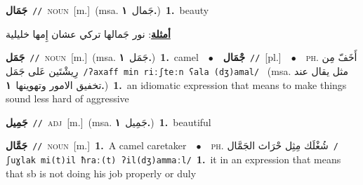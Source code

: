 \documentclass[10pt,a4paper,twoside]{article} %
\begin{document}
\begin{multicols}{2}
{\setlength\topsep{0pt}\textbf{\foreignlanguage{arabic}{جَمَال}}\ {\color{gray}\texttt{//}\color{black}}\ \textsc{noun}\ [m.]\ \color{gray}(msa. \foreignlanguage{arabic}{جَمال}~\foreignlanguage{arabic}{\textbf{١.}})\color{black}\ \textbf{1.}~beauty\  \begin{flushright}\color{gray}\foreignlanguage{arabic}{\textbf{\underline{\foreignlanguage{arabic}{أمثلة}}}: نور جَمالها تركي عشان إِمها خليلية}\end{flushright}\color{black}} \vspace{2mm}

{\setlength\topsep{0pt}\textbf{\foreignlanguage{arabic}{جَمَل}}\ {\color{gray}\texttt{//}\color{black}}\ \textsc{noun}\ [m.]\ \color{gray}(msa. \foreignlanguage{arabic}{جَمَل}~\foreignlanguage{arabic}{\textbf{١.}})\color{black}\ \textbf{1.}~camel\ \ $\bullet$\ \ \setlength\topsep{0pt}\textbf{\foreignlanguage{arabic}{جْمَال}}\ {\color{gray}\texttt{//}\color{black}}\ [pl.]\ \ $\bullet$\ \ \textsc{ph.} \color{gray} \foreignlanguage{arabic}{أَخَفّ مِن رِيشْتَين عَلى جَمَل}\color{black}\ {\color{gray}\texttt{/{\sffamily ʔaxaff min riːʃteːn ʕala (dʒ)amal}/}\color{black}}\ \color{gray} (msa. \foreignlanguage{arabic}{مثل يقال عند تخفيق الامور وتهوينها}~\foreignlanguage{arabic}{\textbf{١.}})\color{black}\ \textbf{1.}~an idiomatic expression that means to make things sound less hard of aggressive\ } \vspace{2mm}

{\setlength\topsep{0pt}\textbf{\foreignlanguage{arabic}{جَمِيل}}\ {\color{gray}\texttt{//}\color{black}}\ \textsc{adj}\ [m.]\ \color{gray}(msa. \foreignlanguage{arabic}{جَمِيل}~\foreignlanguage{arabic}{\textbf{١.}})\color{black}\ \textbf{1.}~beautiful\ } \vspace{2mm}

{\setlength\topsep{0pt}\textbf{\foreignlanguage{arabic}{جَمَّال}}\ {\color{gray}\texttt{//}\color{black}}\ \textsc{noun}\ [m.]\ \textbf{1.}~A camel caretaker\ \ $\bullet$\ \ \textsc{ph.} \color{gray} \foreignlanguage{arabic}{شُغْلَك مِثِل حْرَاث الجَمَّال}\color{black}\ {\color{gray}\texttt{/{\sffamily ʃuɣlak mi(t)il ħraː(t) ʔil(dʒ)ammaːl}/}\color{black}}\ \textbf{1.}~it in an expression that means that sb is not doing his job properly or duly\ } \vspace{2mm}


\end{multicols}
\end{document}

